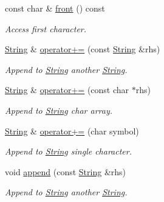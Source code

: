 \begin{DoxyCompactItemize}
\mbox{\label{class_string_a6e8edd0166b680316a4d02f5df9530ea}} 
const char \& \hyperlink{class_string_a6e8edd0166b680316a4d02f5df9530ea}{front} () const
\begin{DoxyCompactList}\small\item\em Access first character. \end{DoxyCompactList}\item 
\mbox{\label{class_string_a07d6a22e524a3c13b6d21c2125bad49f}} 
\hyperlink{class_string}{String} \& \hyperlink{class_string_a07d6a22e524a3c13b6d21c2125bad49f}{operator+=} (const \hyperlink{class_string}{String} \&rhs)
\begin{DoxyCompactList}\small\item\em Append to \hyperlink{class_string}{String} another \hyperlink{class_string}{String}. \end{DoxyCompactList}\item 
\mbox{\label{class_string_a4ee1e376ad8e3fed648ad013e24ab6e4}} 
\hyperlink{class_string}{String} \& \hyperlink{class_string_a4ee1e376ad8e3fed648ad013e24ab6e4}{operator+=} (const char $\ast$rhs)
\begin{DoxyCompactList}\small\item\em Append to \hyperlink{class_string}{String} char array. \end{DoxyCompactList}\item 
\mbox{\label{class_string_a1b42e1ae188f237764911e551953c154}} 
\hyperlink{class_string}{String} \& \hyperlink{class_string_a1b42e1ae188f237764911e551953c154}{operator+=} (char symbol)
\begin{DoxyCompactList}\small\item\em Append to \hyperlink{class_string}{String} single character. \end{DoxyCompactList}\item 
\mbox{\label{class_string_a887c957724678e481e1dd0d8753e8d01}} 
void \hyperlink{class_string_a887c957724678e481e1dd0d8753e8d01}{append} (const \hyperlink{class_string}{String} \&rhs)
\begin{DoxyCompactList}\small\item\em Append to \hyperlink{class_string}{String} another \hyperlink{class_string}{String}. \end{DoxyCompactList}\item 

\end{DoxyCompactItemize}
